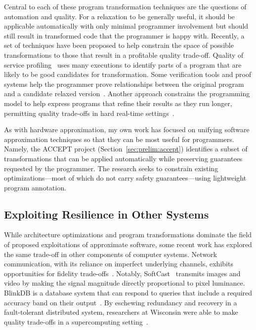 Central to each of these program transformation techniques are the questions
of automation and quality. For a relaxation to be generally useful, it should
be applicable automatically with only minimal programmer involvement but
should still result in transformed code that the programmer is happy with.
Recently, a set of techniques have been proposed to help constrain the space
of possible transformations to those that result in a profitable
quality trade-off. Quality of service profiling~\cite{qosprof} uses many
executions to identify parts of a program that are likely to be good
candidates for transformation. Some verification tools and proof systems help
the programmer prove relationships between the original program and a
candidate relaxed version~\cite{carbin-pldi, carbin-races, carbin-pepm,
rice-transformation-semantics}.
Another approach constrains the programming model to help express programs
that refine their results as they run longer, permitting quality trade-offs in
hard real-time settings~\cite{chung90}.

As with hardware approximation, my own work has focused on unifying software
approximation techniques so that they can be most useful for programmers.
Namely, the ACCEPT project (Section~\ref{sec:prelim:accept}) identifies a
subset of transformations that can be applied automatically while preserving
guarantees requested by the programmer. The research seeks to constrain
existing optimizations---most of which do not carry safety guarantees---using
lightweight program annotation.


\subsection{Exploiting Resilience in Other Systems}

While architecture optimizations and program transformations dominate the
field of proposed exploitations of approximate software, some recent work has
explored the same trade-off in other components of computer systems. Network
communication, with its reliance on imperfect underlying channels, exhibits
opportunities for fidelity trade-offs~\cite{softcast, luo-globecom, apex,
smpmup2006}. Notably, SoftCast~\cite{softcast} transmits images and video by
making the signal magnitude directly proportional to pixel luminance. BlinkDB
is a database system that can respond to queries that include a required
accuracy band on their output~\cite{blinkdb}. By eschewing redundancy and
recovery in a fault-tolerant distributed system, researchers at Wisconsin were
able to make quality trade-offs in a supercomputing
setting~\cite{dekruijf-icpp}.


